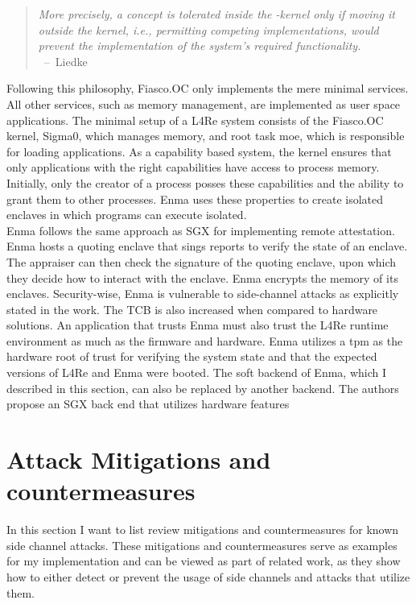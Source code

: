 \begin{quote}
    \textit{ More precisely, a concept is tolerated inside the \mu-kernel only
        if moving it outside the kernel, i.e., permitting competing
        implementations, would prevent the implementation of the system's
        required functionality. \\
    } \mbox{ -- Liedke\cite{liedtke1995micro}}
\end{quote}

Following this philosophy, Fiasco.OC only implements the mere minimal services.
All other services, such as memory management, are implemented as user space
applications. The minimal setup of a L4Re system consists of the Fiasco.OC
kernel, Sigma0, which manages memory, and root task moe, which is responsible
for loading applications. As a capability based system, the kernel ensures that
only applications with the right capabilities have access to process memory.
Initially, only the creator of a process posses these capabilities and the
ability to grant them to other processes. Enma uses these properties to create
isolated enclaves in which programs can execute isolated.\\

Enma follows the same approach as SGX for implementing remote attestation. Enma
hosts a quoting enclave that sings reports to verify the state of an enclave.
The appraiser can then check the signature of the quoting enclave, upon which
they decide how to interact with the enclave. Enma encrypts the memory of its
enclaves. Security-wise, Enma is vulnerable to side-channel attacks as
explicitly stated in the work. The TCB is also increased when compared to
hardware solutions. An application that trusts Enma must also trust the L4Re
runtime environment as much as the firmware and hardware. Enma utilizes a
\gls{tpm} as the hardware root of trust for verifying the system state and that
the expected versions of L4Re and Enma were booted. The soft backend of Enma,
which I described in this section, can also be replaced by another backend. The
authors propose an SGX back end that utilizes hardware features

\section{Attack Mitigations and countermeasures}
\label{sec:20:mitigations}
In this section I want to list review mitigations and countermeasures for known
side channel attacks. These mitigations and countermeasures serve as examples
for my implementation and can be viewed as part of related work, as they show
how to either detect or prevent the usage of side channels and attacks that
utilize them.

